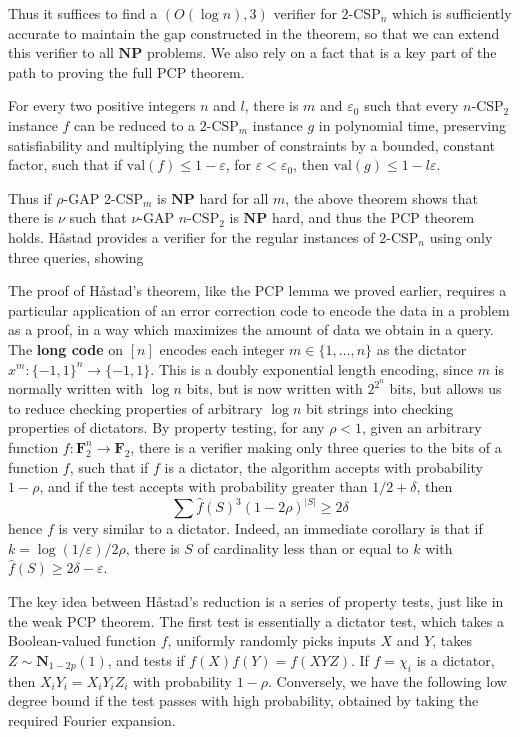 Thus it suffices to find a $(O(\log n), 3)$ verifier for $2\text{-CSP}_n$ which is sufficiently accurate to maintain the gap constructed in the theorem, so that we can extend this verifier to all $\mathbf{NP}$ problems. We also rely on a fact that is a key part of the path to proving the full PCP theorem.

\begin{theorem}
    For every two positive integers $n$ and $l$, there is $m$ and $\varepsilon_0$ such that every $n\text{-CSP}_2$ instance $f$ can be reduced to a $2\text{-CSP}_m$ instance $g$ in polynomial time, preserving satisfiability and multiplying the number of constraints by a bounded, constant factor, such that if $\text{val}(f) \leq 1 - \varepsilon$, for $\varepsilon < \varepsilon_0$, then $\text{val}(g) \leq 1 - l\varepsilon$.
\end{theorem}

Thus if $\rho$-GAP $2\text{-CSP}_m$ is $\mathbf{NP}$ hard for all $m$, the above theorem shows that there is $\nu$ such that $\nu$-GAP $n\text{-CSP}_2$ is $\mathbf{NP}$ hard, and thus the PCP theorem holds. Håstad provides a verifier for the regular instances of $2\text{-CSP}_n$ using only three queries, showing 

The proof of Håstad's theorem, like the PCP lemma we proved earlier, requires a particular application of an error correction code to encode the data in a problem as a proof, in a way which maximizes the amount of data we obtain in a query. The {\bf long code} on $[n]$ encodes each integer $m \in \{ 1, \dots, n \}$ as the dictator $x^m: \{ -1, 1 \}^n \to \{ -1, 1 \}$. This is a doubly exponential length encoding, since $m$ is normally written with $\log n$ bits, but is now written with $2^{2^n}$ bits, but allows us to reduce checking properties of arbitrary $\log n$ bit strings into checking properties of dictators. By property testing, for any $\rho < 1$, given an arbitrary function $f: \mathbf{F}_2^n \to \mathbf{F}_2$, there is a verifier making only three queries to the bits of a function $f$, such that if $f$ is a dictator, the algorithm accepts with probability $1 - \rho$, and if the test accepts with probability greater than $1/2 + \delta$, then
%
\[ \sum \widehat{f}(S)^3 (1 - 2 \rho)^{|S|} \geq 2 \delta \]
%
hence $f$ is very similar to a dictator. Indeed, an immediate corollary is that if $k = \log(1/\varepsilon) /2\rho$, there is $S$ of cardinality less than or equal to $k$ with $\widehat{f}(S) \geq 2\delta - \varepsilon$.

The key idea between Håstad's reduction is a series of property tests, just like in the weak PCP theorem. The first test is essentially a dictator test, which takes a Boolean-valued function $f$, uniformly randomly picks inputs $X$ and $Y$, takes $Z \sim \mathbf{N}_{1-2p}(1)$, and tests if $f(X)f(Y) = f(XYZ)$. If $f = \chi_i$ is a dictator, then $X_iY_i = X_iY_iZ_i$ with probability $1 - \rho$. Conversely, we have the following low degree bound if the test passes with high probability, obtained by taking the required Fourier expansion.

